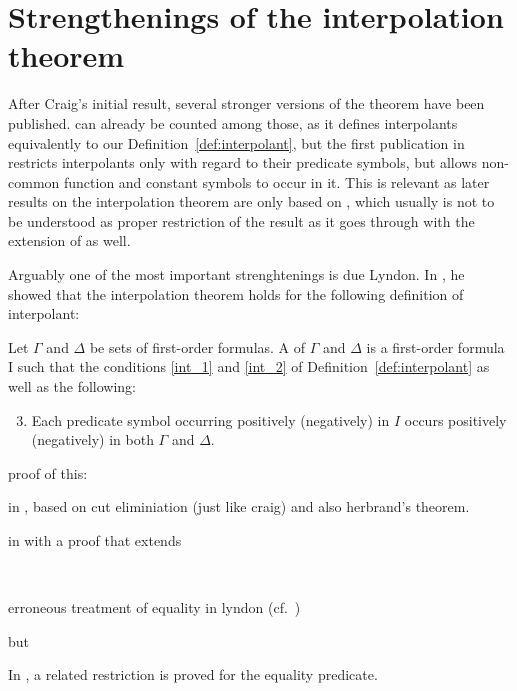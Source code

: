 \section{Strengthenings of the interpolation theorem}

After Craig's initial result, several stronger versions of the theorem have been published.
\cite{Craig57three} can already be counted among those,
as it defines interpolants equivalently to our Definition~\ref{def:interpolant}, 
but the first publication in \cite{Craig57linear} restricts interpolants only with regard to their predicate symbols, but allows non-common function and constant symbols to occur in it.
This is relevant as later results on the interpolation theorem are only based on \cite{Craig57linear}, which usually is not to be understood as proper restriction of the result as it goes through with the extension of \cite{Craig57three} as well.


Arguably one of the most important strenghtenings is due Lyndon. In \cite{lyndon59}, he showed that the interpolation theorem holds for the following definition of interpolant:

\begin{defi}
Let $\Gamma$ and $\Delta$ be sets of first-order formulas. A  of $\Gamma$ and $\Delta$ is a first-order formula I such that the conditions \ref{int_1} and \ref{int_2} of Definition~\ref{def:interpolant} as well as the following:
\begin{enumerate}[\quad\:1'.]
	\setcounter{enumi}{2}
	\item Each predicate symbol occurring positively (negatively) in $I$ occurs positively (negatively) in both $\Gamma$ and $\Delta$.
\end{enumerate}
\end{defi}

proof of this:

in \cite{lyndon59}, based on cut eliminiation (just like craig) and also herbrand's theorem.

in \cite{Henkin63} with a proof that extends \cite{sec:joint_consistency}

~



erroneous treatment of equality in lyndon (cf.\ \cite{motohashi84})

but 

In \cite{oberschelp68}, a related restriction is proved for the equality predicate.

